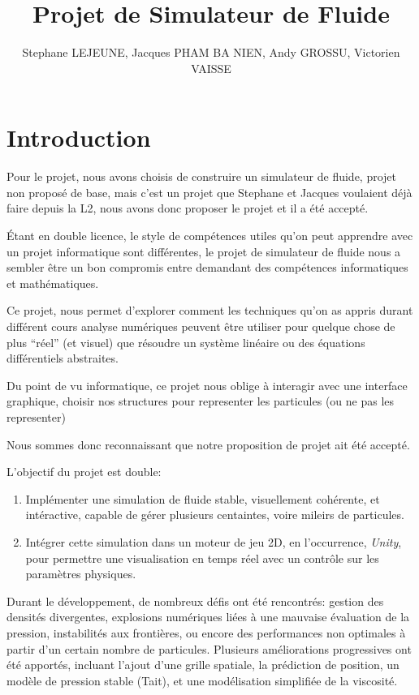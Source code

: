 \documentclass{article}
\author{Stephane LEJEUNE, Jacques PHAM BA NIEN, Andy GROSSU, Victorien VAISSE}
\title{Projet de Simulateur de Fluide}
\begin{document}
\maketitle
\newpage
\tableofcontents
\newpage

\section{Introduction}

Pour le projet, nous avons choisis de construire un simulateur de fluide, projet non proposé de base, mais c'est un projet que Stephane et Jacques voulaient déjà faire depuis la L2, nous avons donc proposer le projet et il a été accepté.

Étant en double licence, le style de compétences utiles qu'on peut apprendre avec un projet informatique sont différentes, le projet de simulateur de fluide nous a sembler être un bon compromis entre demandant des compétences informatiques et mathématiques. 

Ce projet, nous permet d'explorer comment les techniques qu'on as appris durant différent cours analyse numériques peuvent être utiliser pour quelque chose de plus ``réel'' (et visuel) que résoudre un système linéaire ou des équations différentiels abstraites.

Du point de vu informatique, ce projet nous oblige à interagir avec une interface graphique, choisir nos structures pour representer les particules (ou ne pas les representer)

Nous sommes donc reconnaissant que notre proposition de projet ait été accepté.

L'objectif du projet est double:
\begin{enumerate}
    \item Implémenter une simulation de fluide stable, visuellement cohérente, et intéractive, capable de gérer plusieurs centaintes, voire mileirs de particules.
    \item Intégrer cette simulation dans un moteur de jeu 2D, en l'occurrence, {\emph {Unity}}, pour permettre une visualisation en temps réel avec un contrôle sur les paramètres physiques.
\end{enumerate}

Durant le développement, de nombreux défis ont été rencontrés: gestion des densités divergentes, explosions numériques liées à une mauvaise évaluation de la pression, instabilités aux frontières, ou encore des performances non optimales à partir d'un certain nombre de particules. Plusieurs améliorations progressives ont été apportés, incluant l'ajout d'une grille spatiale, la prédiction de position, un modèle de pression stable (Tait), et une modélisation simplifiée de la viscosité.
\end{document}
